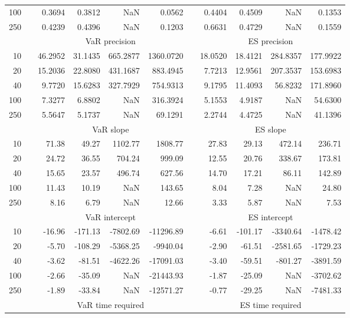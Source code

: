 {{\begin{longtable}{rr rrrr r rrrr}
100 && 0.3694  & 0.3812  &    NaN & 0.0562 && 0.4404  & 0.4509  &    NaN & 0.1353 \\ 
250 && 0.4239  & 0.4396  &    NaN & 0.1203 && 0.6631  & 0.4729  &    NaN & 0.1559 \\ 
\hline 
 & & \multicolumn{4}{c}{VaR precision} &&  \multicolumn{4}{c}{ES precision} \\ \cline{3-6}  \cline{8-11}
10 && 46.2952 & 31.1435 & 665.2877 & 1360.0720 & & 18.0520 & 18.4121 & 284.8357 & 177.9922 \\ 
20 && 15.2036 & 22.8080 & 431.1687 & 883.4945 & & 7.7213 & 12.9561 & 207.3537 & 153.6983 \\ 
40 && 9.7720 & 15.6283 & 327.7929 & 754.9313 & & 9.1795 & 11.4093 & 56.8232 & 171.8960 \\ 
100 && 7.3277 & 6.8802 &    NaN & 316.3924 & & 5.1553 & 4.9187 &    NaN & 54.6300 \\ 
250 && 5.5647 & 5.1737 &    NaN & 69.1291 & & 2.2744 & 4.4725 &    NaN & 41.1396 \\ 
\hline 
 & & \multicolumn{4}{c}{ VaR slope} && \multicolumn{4}{c}{ES slope} \\ \cline{3-6}  \cline{8-11}
10 && 71.38 & 49.27 & 1102.77 & 1808.77 && 27.83 & 29.13 & 472.14 & 236.71 \\ 
20 && 24.72 & 36.55 & 704.24 & 999.09 && 12.55 & 20.76 & 338.67 & 173.81 \\ 
40 && 15.65 & 23.57 & 496.74 & 627.56 && 14.70 & 17.21 & 86.11 & 142.89 \\ 
100 && 11.43 & 10.19 &  NaN & 143.65 && 8.04 & 7.28 &  NaN & 24.80 \\ 
250 && 8.16 & 6.79 &  NaN & 12.66 && 3.33 & 5.87 &  NaN & 7.53 \\ 
\hline 
 & & \multicolumn{4}{c}{ VaR intercept} &&  \multicolumn{4}{c}{ES intercept} \\ \cline{3-6}  \cline{8-11}
10 && -16.96 & -171.13 & -7802.69 & -11296.89 && -6.61 & -101.17 & -3340.64 & -1478.42 \\ 
20 && -5.70 & -108.29 & -5368.25 & -9940.04 && -2.90 & -61.51 & -2581.65 & -1729.23 \\ 
40 && -3.62 & -81.51 & -4622.26 & -17091.03 && -3.40 & -59.51 & -801.27 & -3891.59 \\ 
100 && -2.66 & -35.09 &  NaN & -21443.93 && -1.87 & -25.09 &  NaN & -3702.62 \\ 
250 && -1.89 & -33.84 &  NaN & -12571.27 && -0.77 & -29.25 &  NaN & -7481.33 \\ 
\hline 
 & & \multicolumn{4}{c}{VaR time required} && \multicolumn{4}{c}{ES time required} \\ \cline{3-6}  \cline{8-11}

\end{longtable}}}
